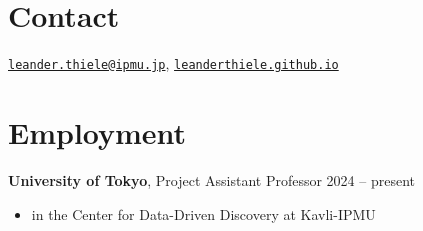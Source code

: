 \documentclass[margin]{res}
\begin{document}
 

\vspace*{0.8cm}


\begin{resume} 


\vspace*{-0.5cm}
\section{Contact}
\href{mailto:leander.thiele@ipmu.jp}{\texttt{leander.thiele@ipmu.jp}},
\href{https://leanderthiele.github.io}{\texttt{leanderthiele.github.io}}



\section{Employment}
  {\bf University of Tokyo}, Project Assistant Professor \hfill 2024 -- present
  \begin{itemize}
    \item in the Center for Data-Driven Discovery at Kavli-IPMU
  \end{itemize}


\end{resume}
\end{document}
